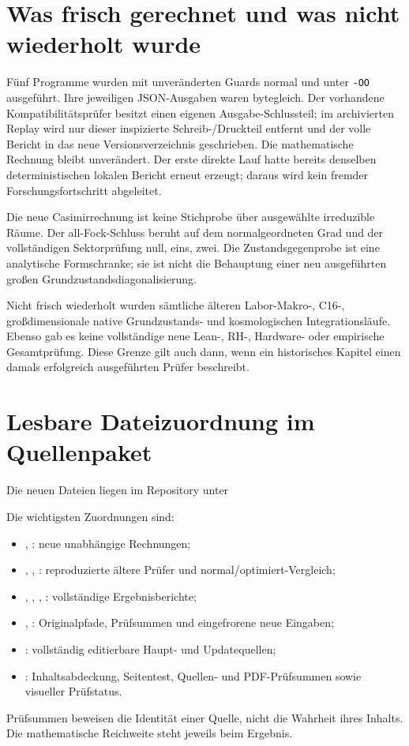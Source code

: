 \section{Was frisch gerechnet und was nicht wiederholt wurde}
Fünf Programme wurden mit unveränderten Guards normal und unter \texttt{-OO} ausgeführt. Ihre jeweiligen JSON-Ausgaben waren bytegleich. Der vorhandene Kompatibilitätsprüfer besitzt einen eigenen Ausgabe-Schlussteil; im archivierten Replay wird nur dieser inspizierte Schreib-/Druckteil entfernt und der volle Bericht in das neue Versionsverzeichnis geschrieben. Die mathematische Rechnung bleibt unverändert. Der erste direkte Lauf hatte bereits denselben deterministischen lokalen Bericht erneut erzeugt; daraus wird kein fremder Forschungsfortschritt abgeleitet.

Die neue Casimirrechnung ist keine Stichprobe über ausgewählte irreduzible Räume. Der all-Fock-Schluss beruht auf dem normalgeordneten Grad und der vollständigen Sektorprüfung null, eins, zwei. Die Zustandsgegenprobe ist eine analytische Formschranke; sie ist nicht die Behauptung einer neu ausgeführten großen Grundzustandsdiagonalisierung.

Nicht frisch wiederholt wurden sämtliche älteren Labor-Makro-, C16-, großdimensionale native Grundzustands- und kosmologischen Integrationsläufe. Ebenso gab es keine vollständige neue Lean-, RH-, Hardware- oder empirische Gesamtprüfung. Diese Grenze gilt auch dann, wenn ein historisches Kapitel einen damals erfolgreich ausgeführten Prüfer beschreibt.

\section{Lesbare Dateizuordnung im Quellenpaket}
Die neuen Dateien liegen im Repository unter
\begin{quote}\small{}\end{quote}
Die wichtigsten Zuordnungen sind:
\begin{itemize}
\item {}, : neue unabhängige Rechnungen;
\item {}, , : reproduzierte ältere Prüfer und normal/optimiert-Vergleich;
\item {}, , , : vollständige Ergebnisberichte;
\item {}, : Originalpfade, Prüfsummen und eingefrorene neue Eingaben;
\item {}: vollständig editierbare Haupt- und Updatequellen;
\item {}: Inhaltsabdeckung, Seitentest, Quellen- und PDF-Prüfsummen sowie visueller Prüfstatus.
\end{itemize}
Prüfsummen beweisen die Identität einer Quelle, nicht die Wahrheit ihres Inhalts. Die mathematische Reichweite steht jeweils beim Ergebnis.

